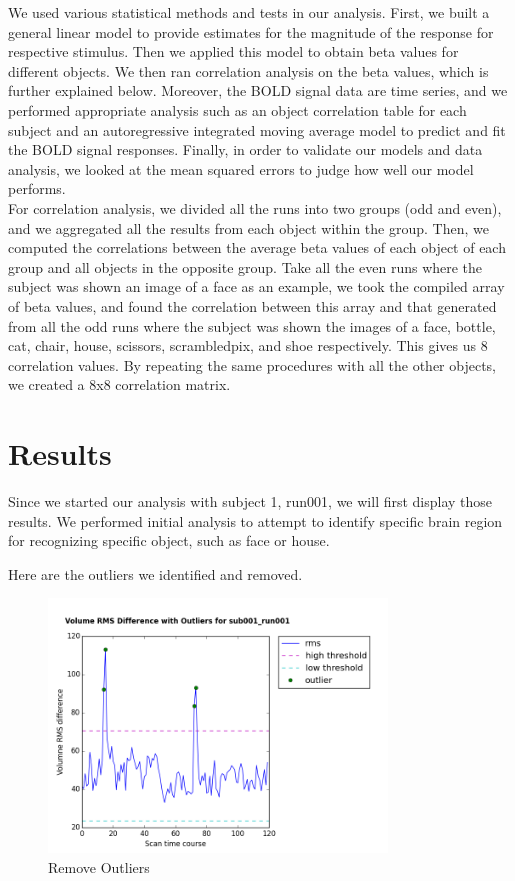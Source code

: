 \documentclass[11pt,twocolumn]{article}
\begin{document}
We used various statistical methods and tests in our analysis. First,
we built a general linear model to provide estimates for the magnitude of
the response for respective stimulus. Then we applied this model to obtain
beta values for different objects. We then ran correlation analysis on the
beta values, which is further explained below. Moreover, the BOLD signal 
data are time series, and we performed appropriate analysis such as 
an object correlation table for each subject and an autoregressive integrated
moving average model to predict and fit the BOLD signal responses. 
Finally, in order to validate our models and data analysis, we looked 
at the mean squared errors to judge how well our model performs. \\

For correlation analysis, we divided all the runs into two groups (odd and 
even), and we aggregated all the results from each object within the group. 
Then, we computed the correlations between the average beta values of each 
object of each group and all objects in the opposite group. Take all the even 
runs where the subject was shown an image of a face as an example, we took 
the compiled array of beta values, and found the correlation between this 
array and that generated from all the odd runs where the subject was shown 
the images of a face, bottle, cat, chair, house, scissors, scrambledpix, and 
shoe respectively. This gives us 8 correlation values. By repeating the same 
procedures with all the other objects, we created a 8x8 correlation matrix. \\

\section{Results}

Since we started our analysis with subject 1, run001, we will first display 
those results. We performed initial analysis to attempt to identify specific 
brain region for recognizing specific object, such as face or house. 

Here are the outliers we identified and removed.
\begin{figure}[h!]
\centering
\includegraphics[width=90mm]{Volume_RMS_Difference_Outliers_sub001_run001.png}
\caption{Remove Outliers}
\end{figure}
\end{document}
